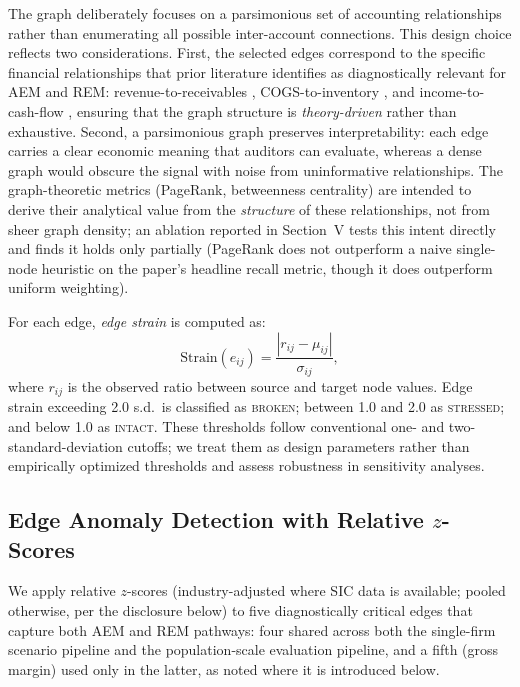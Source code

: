 \documentclass[12pt]{article}
\begin{document}
The graph deliberately focuses on a parsimonious set of accounting
relationships rather than enumerating all possible inter-account connections.
This design choice reflects two considerations.  First, the selected edges
correspond to the specific financial relationships that prior literature
identifies as diagnostically relevant for AEM and REM: revenue-to-receivables
\citep{beneish1999}, COGS-to-inventory \citep{roychowdhury2006}, and
income-to-cash-flow \citep{dechow2011}, ensuring that the graph structure is
\emph{theory-driven} rather than exhaustive.  Second, a parsimonious graph
preserves interpretability: each edge carries a clear economic meaning that
auditors can evaluate, whereas a dense graph would obscure the signal with
noise from uninformative relationships.  The graph-theoretic metrics
(PageRank, betweenness centrality) are intended to derive their analytical
value from the \emph{structure} of these relationships, not from sheer
graph density; an ablation reported in Section~V tests this intent
directly and finds it holds only partially (PageRank does not
outperform a naive single-node heuristic on the paper's headline
recall metric, though it does outperform uniform weighting).

For each edge, \emph{edge strain} is computed as:
\begin{equation}
\text{Strain}(e_{ij}) = \frac{|r_{ij} - \mu_{ij}|}{\sigma_{ij}},
\label{eq:strain}
\end{equation}
where $r_{ij}$ is the observed ratio between source and target node values.
Edge strain exceeding 2.0 s.d.\ is classified as \textsc{broken}; between 1.0
and 2.0 as \textsc{stressed}; and below 1.0 as \textsc{intact}.  These
thresholds follow conventional one- and two-standard-deviation cutoffs;
we treat them as design parameters rather than empirically optimized
thresholds and assess robustness in sensitivity analyses.

\subsection*{Edge Anomaly Detection with Relative $z$-Scores}
\label{subsec:anomaly}

We apply relative $z$-scores (industry-adjusted where SIC data is
available; pooled otherwise, per the disclosure below) to five
diagnostically critical edges
that capture both AEM and REM pathways: four shared across both the
single-firm scenario pipeline and the population-scale evaluation
pipeline, and a fifth (gross margin) used only in the latter, as noted
where it is introduced below.
\end{document}
